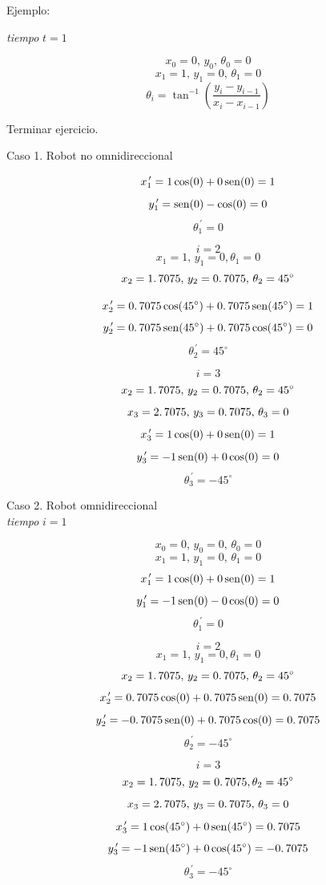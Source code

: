 Ejemplo:


\textit{tiempo} $t = 1$

$$x_{0} = 0,\, y_{0}, \, \theta_{0} = 0$$
$$x_{1} = 1,\, y_{1} = 0, \, \theta_{1} = 0$$
$$\theta_{i} = \tan^{-1} \left( \dfrac{y_{i} - y_{i - 1}}{x_{i} - x_{i - 1}} \right) $$

Terminar ejercicio.

Caso 1. Robot no omnidireccional

$$x_{1}^{\, \prime} = 1 \cos (0) + 0 \mathop{\rm sen}\nolimits (0) = 1$$
$$y_{1}^{\, \prime} = \mathop{\rm sen}\nolimits (0) - \cos (0) = 0$$
$$\theta_{1}^{\, \prime} = 0$$
	
$$i = 2$$
$$x_{1} = 1, \, y_{1} = 0, \theta_{1} = 0$$
$$x_{2} = 1\ldotp 7075,\, y_{2} = 0\ldotp 7075, \, \theta_{2} = 45^\circ$$

$$x_{2}^{\, \prime} = 0\ldotp7075 \cos (45^\circ) + 0\ldotp7075 \mathop{\rm sen}\nolimits (45^\circ) = 1$$
$$y_{2}^{\, \prime} = 0\ldotp7075 \mathop{\rm sen}\nolimits (45^\circ) + 0\ldotp7075 \cos (45^\circ) = 0$$
$$\theta_{2}^{\, \prime} = 45^\circ$$

$$i = 3$$
$$x_{2} = 1\ldotp7075,\, y_{2} = 0\ldotp7075,\, \theta_{2} = 45^\circ$$
$$x_{3} = 2\ldotp7075,\, y_{3} = 0\ldotp7075,\, \theta_{3} = 0$$
$$x_{3}^{\,\prime} = 1 \cos (0) + 0\mathop{\rm sen}\nolimits (0) = 1$$
$$y_{3}^{\,\prime} = - 1 \mathop{\rm sen}\nolimits (0) + 0\cos (0) = 0$$
$$\theta_{3}^{\,\prime} = -45^\circ$$

Caso 2. Robot omnidireccional \\
\textit{tiempo} $i = 1$

$$x_{0} = 0,\, y_{0} = 0,\, \theta_{0} = 0$$
$$x_{1} = 1,\, y_{1} = 0,\, \theta_{1} = 0$$
$$x_{1}^{\,\prime} = 1 \cos (0) + 0\mathop{\rm sen}\nolimits (0) = 1$$
$$y_{1}^{\,\prime} = - 1 \mathop{\rm sen}\nolimits (0) - 0\cos (0) = 0$$
$$\theta_{1}^{\,\prime} = 0$$

$$i = 2$$
$$x_{1} = 1, \, y_{1} = 0, \theta_{1} = 0$$
$$x_{2} = 1\ldotp7075,\, y_{2} = 0\ldotp7075,\, \theta_{2} = 45^\circ$$
$$x_{2}^{\,\prime} = 0\ldotp7075 \cos (0) + 0\ldotp7075\mathop{\rm sen}\nolimits (0) = 0\ldotp7075$$
$$y_{2}^{\,\prime} = - 0\ldotp7075 \mathop{\rm sen}\nolimits (0) + 0\ldotp7075\cos (0) = 0\ldotp7075$$
$$\theta_{2}^{\,\prime} = -45^\circ$$

$$i = 3$$
$$x_{2} = 1\ldotp7075, \, y_{2} = 0\ldotp7075, \theta_{2} = 45^\circ$$
$$x_{3} = 2\ldotp7075,\, y_{3} = 0\ldotp7075,\, \theta_{3} = 0$$
$$x_{3}^{\,\prime} = 1 \cos (45^\circ) + 0\mathop{\rm sen}\nolimits (45^\circ) = 0\ldotp7075$$
$$y_{3}^{\,\prime} = - 1 \mathop{\rm sen}\nolimits (45^\circ) + 0 \cos (45^\circ) = -0\ldotp7075$$
$$\theta_{3}^{\,\prime} = -45^\circ$$



